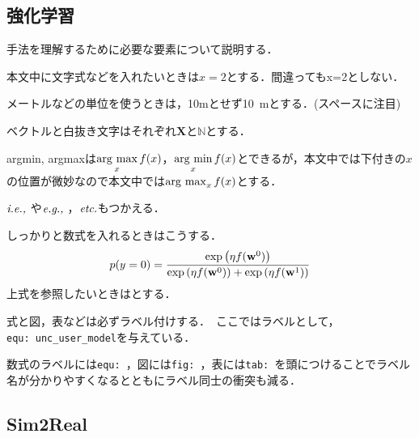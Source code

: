 \subsection{強化学習}
手法を理解するために必要な要素について説明する．

\vspace{10truemm}

本文中に文字式などを入れたいときは$x=2$とする．間違ってもx=2としない．

メートルなどの単位を使うときは，10mとせず\SI{10}{m}とする．(スペースに注目)

ベクトルと白抜き文字はそれぞれ$\mathbf{X}$と$\mathbb{N}$とする．

argmin, argmaxは$\mathop{\rm arg~max}\limits_x f(x)$，$\mathop{\rm arg~min}\limits_x f(x)$とできるが，本文中では下付きの$x$の位置が微妙なので本文中では$\operatorname*{\rm arg~max}_x f(x)$とする．

$\textit{i.e.,}~$や$\textit{e.g.,}~$，$\textit{etc.}$もつかえる．

しっかりと数式を入れるときはこうする．
\begin{equation}
    p(y=0) = \frac{\exp \left(\eta f({\bf w}^0)\right)}{\exp \left(\eta f({\bf w}^0)\right) + \exp \left(\eta f({\bf w}^1)\right)} 
    \label{equ: unc_user_model}
\end{equation}
上式を参照したいときはとする．

式と図，表などは必ずラベル付けする．\
ここではラベルとして，\texttt{equ:~unc\_user\_model}を与えている．

数式のラベルには\texttt{equ:~}，図には\texttt{fig:~}，表には\texttt{tab:~}を頭につけることでラベル名が分かりやすくなるとともにラベル同士の衝突も減る．

\subsection{Sim2Real}